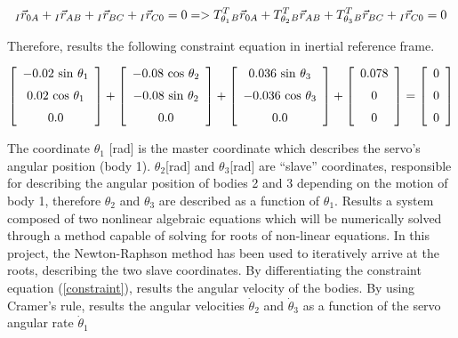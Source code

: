 \begin{equation}\label{constraintlong}
_I\vec{r}_{0A} + {_I}\vec{r}_{AB}+{_I}\vec{r}_{BC}+{_I}\vec{r}_{C0}=0 \\
=> \\T_{\theta _1}^T {_B}\vec{r}_{0A} + T_{\theta _2}^T {_B}\vec{r}_{AB} + T_{\theta _3}^T {_B}\vec{r}_{BC} + {_I}\vec{r}_{C0}=0 
\end{equation}

Therefore, results the following constraint equation in inertial reference frame.

\begin{equation}\label{constvector}
 \left[ \begin {array}{c} - 0.02\,\sin\,\theta_{1}
\\ \noalign{\medskip} 0.02\,\cos\,\theta_{1}\\ \noalign{\medskip} 0.0
\end {array} \right] 
+
 \left[ \begin {array}{c} - 0.08\,\cos\,\theta_{2}
\\ \noalign{\medskip}- 0.08\,\sin\,\theta_{2}\\ \noalign{\medskip}
 0.0\end {array} \right] 
+
 \left[ \begin {array}{c}  0.036\,\sin\,\theta_{3}
\\ \noalign{\medskip}- 0.036\,\cos\,\theta_{3}\\ \noalign{\medskip}
 0.0\end {array} \right]
+ \left[ \begin {array}{c}  0.078\\ \noalign{\medskip}0
\\ \noalign{\medskip}0\end {array} \right] 
= \left[ \begin {array}{c} 0\\ \noalign{\medskip}0\\ \noalign{\medskip}0
\end {array} \right] 
\end{equation}

The coordinate $\theta_1 $ [rad] is the master coordinate which describes the servo’s angular position (body 1).
$\theta_2 $[rad] and $\theta_3 $[rad] are “slave” coordinates, responsible for describing the angular position of bodies 2 and 3 depending on the motion of body 1, therefore $\theta_2 $ and $\theta_3 $ are described as a function of $\theta_1 $. Results a system composed of two nonlinear algebraic equations which will be numerically solved through a method capable of solving for roots of non-linear equations. In this project, the Newton-Raphson method has been used to iteratively arrive at the roots, describing the two slave coordinates. By differentiating the constraint equation (\ref{constraint}), results the angular velocity of the bodies. By using Cramer's rule, results the angular velocities $\dot{\theta}{_2}$ and $\dot{\theta}{_3}$ as a function of the servo angular rate $\dot{\theta}{_1}$

